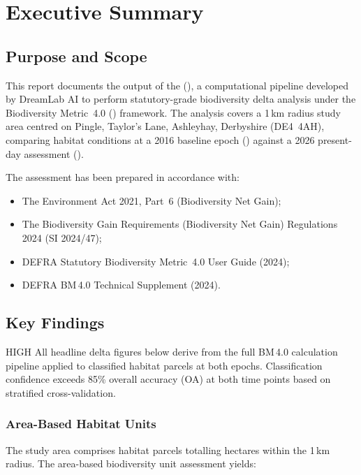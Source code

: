 \chapter{Executive Summary}
\label{ch:execsummary}

\section{Purpose and Scope}

This report documents the output of the \BDE{} (\BDE), a computational pipeline developed by DreamLab AI to perform statutory-grade biodiversity delta analysis under the Biodiversity Metric~4.0 (\BM) framework. The analysis covers a 1\,km radius study area centred on Pingle, Taylor's Lane, Ashleyhay, Derbyshire (DE4~4AH), comparing habitat conditions at a 2016 baseline epoch (\Tzero) against a 2026 present-day assessment (\Tone).

The assessment has been prepared in accordance with:
\begin{itemize}[nosep]
  \item The Environment Act 2021, Part~6 (Biodiversity Net Gain);
  \item The Biodiversity Gain Requirements (Biodiversity Net Gain) Regulations 2024 (SI 2024/47);
  \item DEFRA Statutory Biodiversity Metric~4.0 User Guide (2024);
  \item DEFRA BM\,4.0 Technical Supplement (2024).
\end{itemize}

\section{Key Findings}

\begin{confidencebox}{HIGH}
All headline delta figures below derive from the full BM\,4.0 calculation pipeline applied to classified habitat parcels at both epochs. Classification confidence exceeds 85\% overall accuracy (OA) at both time points based on stratified cross-validation.
\end{confidencebox}

\subsection{Area-Based Habitat Units}

The study area comprises  habitat parcels totalling  hectares within the 1\,km radius. The area-based biodiversity unit assessment yields:


